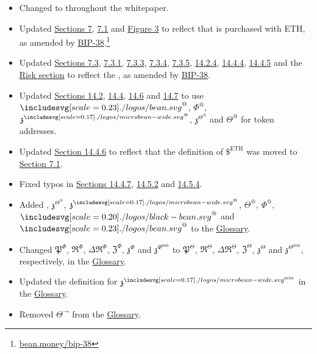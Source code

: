 \documentclass[class=article, crop=false]{standalone}
\begin{document}
\begin{itemize}[topsep=0pt, itemsep=3pt,leftmargin=16pt]
    \begin{itemize}
        \item Changed  to  throughout the whitepaper.
        \item Updated \hyperlink{section.7}{Sections 7}, \hyperlink{subsection.7.1}{7.1} and \hyperref[fig 3]{Figure 3} to reflect that  is purchased with ETH, as amended by \href{https://bean.money/bip-38}{BIP-38}.\footnote{\href{https://bean.money/bip-38}{bean.money/bip-38}}
        \item Updated \hyperlink{subsection.7.3}{Sections 7.3}, \hyperlink{subsubsection.7.3.1}{7.3.1}, \hyperlink{subsubsection.7.3.3}{7.3.3}, \hyperlink{subsubsection.7.3.4}{7.3.4}, \hyperlink{subsubsection.7.3.5}{7.3.5}, \hyperlink{subsubsection.14.2.4}{14.2.4}, \hyperlink{subsubsection.14.4.4}{14.4.4}, \hyperlink{subsubsection.14.4.5}{14.4.5} and the \hyperlink{section.12}{Risk section} to reflect the , as amended by \href{https://bean.money/bip-38}{BIP-38}.
        \item Updated \hyperlink{subsection.14.2}{Sections 14.2}, \hyperlink{subsection.14.4}{14.4}, \hyperlink{subsection.14.6}{14.6} and \hyperlink{subsection.14.7}{14.7} to use $\Bean^{@}$, $\Phi^{@}$, $\mathfrak{z}^{\bean^@}$, $\mathfrak{z}^{\Theta^@}$ and $\Theta^{@}$ for token addresses.
        \item Updated \hyperlink{subsubsection.14.4.6}{Section 14.4.6} to reflect that the definition of $\$^{\text{ETH}}$ was moved to \hyperlink{subsection.7.1}{Section 7.1}.
        \item Fixed typos in \hyperlink{subsubsection.14.4.7}{Sections 14.4.7}, \hyperlink{subsubsection.14.5.2}{14.5.2} and \hyperlink{subsubsection.14.5.4}{14.5.4}.
        \item Added , $\mathfrak{z}^{\Theta^@}$, $\mathfrak{z}^{\bean^@}$, $\Theta^{@}$, $\Phi^{@}$, $\Beanstalk^{@}$ and $\Bean^{@}$ to the \hyperlink{subsection.14.11}{Glossary}.
        \item Changed $\mathfrak{P}^{\Phi}$, $\mathfrak{R}^{\Phi}$, $\Delta \mathfrak{R}^{\Phi}$, $\mathfrak{Z}^{\Phi}$, $\mathfrak{z}^{\Phi}$ and $\mathfrak{z}^{\Phi^{\text{min}}}$ to $\mathfrak{P}^{\Theta}$, $\mathfrak{R}^{\Theta}$, $\Delta \mathfrak{R}^{\Theta}$, $\mathfrak{Z}^{\Theta}$, $\mathfrak{z}^{\Theta}$ and $\mathfrak{z}^{\Theta^{\text{min}}}$, respectively, in the \hyperlink{subsection.14.11}{Glossary}.
        \item Updated the definition for $\mathfrak{z}^{\bean^{\text{min}}}$ in the \hyperlink{subsection.14.11}{Glossary}.
        \item Removed $\Theta^{\rightarrow}$ from the \hyperlink{subsection.14.11}{Glossary}.
    \end{itemize}
\end{itemize}
\end{document}
